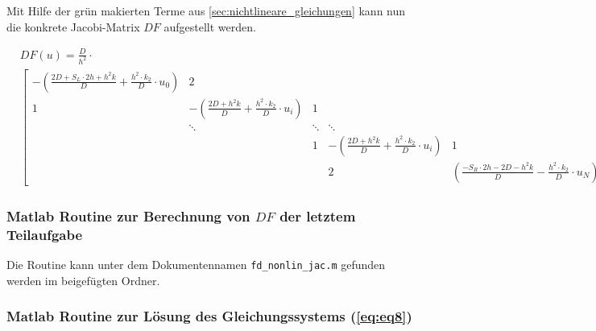 \documentclass[
	pagesize,
	fontsize=12pt,
	paper=a4,
	oneside,
   reqno
]{scrartcl}
\begin{document}
\clearpage

\begin{landscape}

Mit Hilfe der grün makierten Terme aus \autoref{sec:nichtlineare_gleichungen} kann nun die konkrete Jacobi-Matrix $DF$ aufgestellt werden.

\begin{align*}
   & DF(u) = \frac{D}{h^2}\cdot \\
   &
   \begin{bmatrix*}
      -\left( \frac{2D+S_L\cdot 2h+h^2k}{D}+\frac{h^2\cdot k_2}{D}\cdot u_0\right)  & 2 \\
                     1                                                              & -\left( \frac{2D+h^2k}{D}+\frac{h^2\cdot k_2}{D}\cdot u_i\right)   & 1 \\
                                                                                    & \ddots                                                             & \ddots & \ddots \\
                                                                                                                                                         &        & 1   & -\left( \frac{2D+h^2k}{D}+\frac{h^2\cdot k_2}{D}\cdot u_i\right)   & 1 \\
                                                                                                                                                         &        &     & 2                                                                  & \left( \frac{-S_R\cdot 2h-2D-h^2k}{D}-\frac{h^2\cdot k_2}{D}\cdot u_N\right)
   \end{bmatrix*}
\end{align*}

\end{landscape}

\clearpage

\subsubsection{Matlab Routine zur Berechnung von $DF$ der letztem Teilaufgabe}

Die Routine kann unter dem Dokumentennamen \texttt{fd\_nonlin\_jac.m} gefunden werden im beigefügten Ordner.

\subsubsection{Matlab Routine zur Lösung des Gleichungssystems (\autoref{eq:eq8})}
\end{document}
